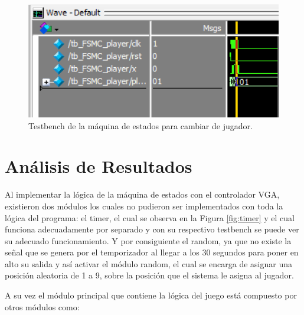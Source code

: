 \documentclass[journal,trans]{IEEEtran}
\begin{document}
	\begin{figure}[hbtp]
		\centering
		\includegraphics[width = \columnwidth]{imagenes/player.png}
		\caption[Figura1]{Testbench de la máquina de estados para cambiar de jugador.}
		\label{fig:play}
	\end{figure}
	
	\section{Análisis de Resultados}
	
	Al implementar la lógica de la máquina de estados con el controlador VGA, existieron dos módulos los cuales no pudieron ser implementados con toda la lógica del programa: el timer, el cual se observa en la Figura \ref{fig:timer} y el cual funciona adecuadamente por separado y con su respectivo testbench se puede ver su adecuado funcionamiento. Y por consiguiente el random, ya que no existe la señal que se genera por el temporizador al llegar a los 30 segundos para poner en alto su salida y así activar el módulo random, el cual se encarga de asignar una posición aleatoria de 1 a 9, sobre la posición que el sistema le asigna al jugador.
	
	A su vez el módulo principal que contiene la lógica del juego está compuesto por otros módulos como:
	
\end{document}
